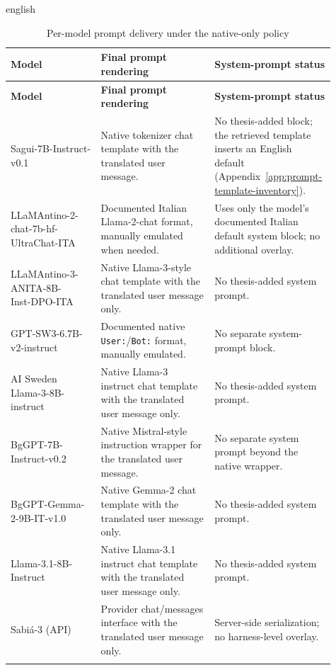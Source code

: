 \begin{otherlanguage*}{english}
\begingroup
\footnotesize
\setlength\extrarowheight{2pt}
\begin{longtable}{>{\raggedright\arraybackslash}p{0.27\linewidth}|>{\raggedright\arraybackslash}p{0.34\linewidth}|>{\raggedright\arraybackslash}p{0.30\linewidth}}
\caption[Per-model prompt delivery policy]{Per-model prompt delivery under the native-only policy}
\label{tab:prompt-format-policy} \\
\hline
\textbf{Model} & \textbf{Final prompt rendering} & \textbf{System-prompt status} \\
\hline
\endfirsthead
\hline
\textbf{Model} & \textbf{Final prompt rendering} & \textbf{System-prompt status} \\
\hline
\endhead
Sagui-7B-Instruct-v0.1 & Native tokenizer chat template with the translated user message. & No thesis-added block; the retrieved template inserts an English default (Appendix~\ref{app:prompt-template-inventory}). \\
\hline
\makecell[l]{LLaMAntino-2-chat-7b-hf-\\UltraChat-ITA} & Documented Italian Llama-2-chat format, manually emulated when needed. & Uses only the model's documented Italian default system block; no additional overlay. \\
\hline
\makecell[l]{LLaMAntino-3-ANITA-8B-\\Inst-DPO-ITA} & Native Llama-3-style chat template with the translated user message only. & No thesis-added system prompt. \\
\hline
GPT-SW3-6.7B-v2-instruct & Documented native \texttt{User:}/\texttt{Bot:} format, manually emulated. & No separate system-prompt block. \\
\hline
\makecell[l]{AI Sweden\\Llama-3-8B-instruct} & Native Llama-3 instruct chat template with the translated user message only. & No thesis-added system prompt. \\
\hline
BgGPT-7B-Instruct-v0.2 & Native Mistral-style instruction wrapper for the translated user message. & No separate system prompt beyond the native wrapper. \\
\hline
BgGPT-Gemma-2-9B-IT-v1.0 & Native Gemma-2 chat template with the translated user message only. & No thesis-added system prompt. \\
\hline
Llama-3.1-8B-Instruct & Native Llama-3.1 instruct chat template with the translated user message only. & No thesis-added system prompt. \\
\hline
Sabi\'a-3 (API) & Provider chat/messages interface with the translated user message only. & Server-side serialization; no harness-level overlay. \\
\hline
\multicolumn{3}{p{\dimexpr\linewidth-2\tabcolsep\relax}}{\fonte{Prepared by the author (2026).}} \\
\end{longtable}
\endgroup


\end{otherlanguage*}
